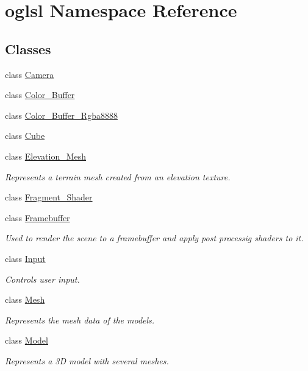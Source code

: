 \hypertarget{namespaceoglsl}{}\section{oglsl Namespace Reference}
\label{namespaceoglsl}
\subsection*{Classes}
\begin{DoxyCompactItemize}
\item 
class \mbox{\hyperlink{classoglsl_1_1_camera}{Camera}}
\item 
class \mbox{\hyperlink{classoglsl_1_1_color___buffer}{Color\+\_\+\+Buffer}}
\item 
class \mbox{\hyperlink{classoglsl_1_1_color___buffer___rgba8888}{Color\+\_\+\+Buffer\+\_\+\+Rgba8888}}
\item 
class \mbox{\hyperlink{classoglsl_1_1_cube}{Cube}}
\item 
class \mbox{\hyperlink{classoglsl_1_1_elevation___mesh}{Elevation\+\_\+\+Mesh}}
\begin{DoxyCompactList}\small\item\em Represents a terrain mesh created from an elevation texture. \end{DoxyCompactList}\item 
class \mbox{\hyperlink{classoglsl_1_1_fragment___shader}{Fragment\+\_\+\+Shader}}
\item 
class \mbox{\hyperlink{classoglsl_1_1_framebuffer}{Framebuffer}}
\begin{DoxyCompactList}\small\item\em Used to render the scene to a framebuffer and apply post processig shaders to it. \end{DoxyCompactList}\item 
class \mbox{\hyperlink{classoglsl_1_1_input}{Input}}
\begin{DoxyCompactList}\small\item\em Controls user input. \end{DoxyCompactList}\item 
class \mbox{\hyperlink{classoglsl_1_1_mesh}{Mesh}}
\begin{DoxyCompactList}\small\item\em Represents the mesh data of the models. \end{DoxyCompactList}\item 
class \mbox{\hyperlink{classoglsl_1_1_model}{Model}}
\begin{DoxyCompactList}\small\item\em Represents a 3D model with several meshes. \end{DoxyCompactList}\item 

\end{DoxyCompactItemize}
